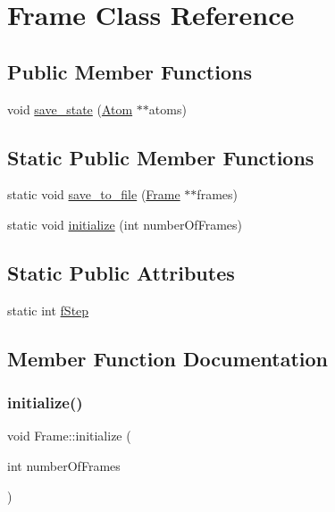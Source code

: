 \hypertarget{class_frame}{}\section{Frame Class Reference}
\label{class_frame}
\subsection*{Public Member Functions}
\begin{DoxyCompactItemize}
\item 
void \mbox{\hyperlink{class_frame_a03b0febb7a423f343a97f5b937ca74bb}{save\+\_\+state}} (\mbox{\hyperlink{class_atom}{Atom}} $\ast$$\ast$atoms)
\end{DoxyCompactItemize}
\subsection*{Static Public Member Functions}
\begin{DoxyCompactItemize}
\item 
static void \mbox{\hyperlink{class_frame_aa3523e2ec8247c6c5f2bb102d5016971}{save\+\_\+to\+\_\+file}} (\mbox{\hyperlink{class_frame}{Frame}} $\ast$$\ast$frames)
\item 
static void \mbox{\hyperlink{class_frame_a78558e230dba7e5bf57916d38af7536c}{initialize}} (int number\+Of\+Frames)
\end{DoxyCompactItemize}
\subsection*{Static Public Attributes}
\begin{DoxyCompactItemize}
\item 
static int \mbox{\hyperlink{class_frame_ae7615c7221ced614d59ce461deed3a5f}{f\+Step}}
\end{DoxyCompactItemize}


\subsection{Member Function Documentation}
\mbox{\label{class_frame_a78558e230dba7e5bf57916d38af7536c}} 
\subsubsection{\texorpdfstring{initialize()}{initialize()}}
{\footnotesize\ttfamily void Frame\+::initialize (\begin{DoxyParamCaption}\item[{int}]{number\+Of\+Frames }\end{DoxyParamCaption})\hspace{0.3cm}{\ttfamily [static]}}

